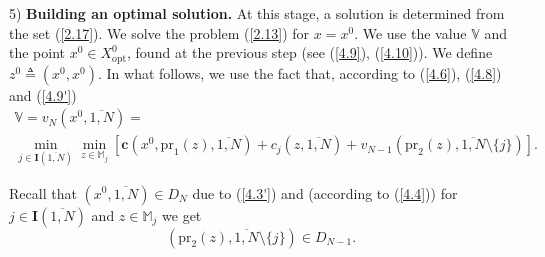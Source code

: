 5) {\bf Building an optimal solution.}
At this stage, a solution is determined from the set (\ref{2.17}).
We solve the problem
 (\ref{2.13})
for
$x=x^0$.
We use the value
$\mathbb{V}$
and the point
$x^0 \in X^0_{\mathrm{opt}}$,
found at the previous step
(see (\ref{4.9}), (\ref{4.10})).
We define $z^0 {\triangleq} (x^0,x^0)$.
In what follows, we use the fact that, according to
 (\ref{4.6}), (\ref{4.8}) and (\ref{4.9'})
\begin{multline}
  \label{4.11}
  \mathbb{V} = v_N(x^0,\overline{1,N}) = \\
  \min\limits_{j \in \mathbf{I}(\overline{1,N})}
  \min\limits_{z \in \mathbb{M}_j}
  [\mathbf{c}(x^0,\mathrm{pr}_1(z),\overline{1,N}) + c_j(z,\overline{1,N}) + v_{N-1}(\mathrm{pr}_2(z),\overline{1,N} \setminus \{j\})].
\end{multline}

Recall that
$(x^0,\overline{1,N}) \in D_N$
due to (\ref{4.3'})
and
(according to (\ref{4.4}))
for
$j \in \mathbf{I}(\overline{1,N})$
and
$z \in \mathbb{M}_j$
we get
$$
  (\mathrm{pr}_2(z),\overline{1,N} \setminus \{j\}) \in D_{N-1}
  .
$$

